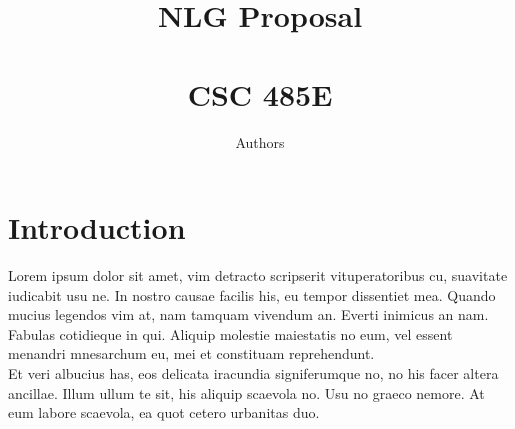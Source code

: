\documentclass[12pt]{article}
\begin{document}
\title{NLG Proposal\\ \hrulefill \\
	CSC 485E}
\author{Authors}


\maketitle


\section{Introduction}
Lorem ipsum dolor sit amet, vim detracto scripserit vituperatoribus cu, suavitate iudicabit usu ne. In nostro causae facilis his, eu tempor dissentiet mea\cite{winkler1984venn}. Quando mucius legendos vim at, nam tamquam vivendum an. Everti inimicus an nam. Fabulas cotidieque in qui. Aliquip molestie maiestatis no eum, vel essent menandri mnesarchum eu, mei et constituam reprehendunt. \\

Et veri albucius has, eos delicata iracundia signiferumque no, no his facer altera ancillae\cite{ruskey1997survey}. Illum ullum te sit, his aliquip scaevola no. Usu no graeco nemore. At eum labore scaevola, ea quot cetero urbanitas duo\cite{bultena2013face}.

 


\end{document}
